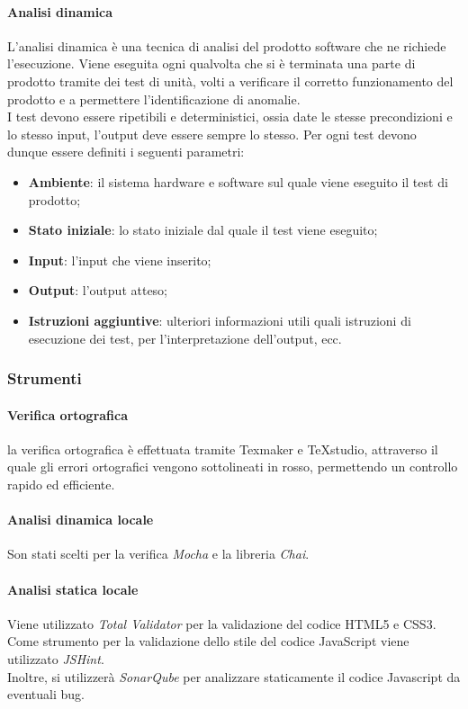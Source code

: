 \documentclass[11pt,a4paper]{article}
\begin{document}
{	\paragraph{Analisi dinamica\\}
	L'analisi dinamica è una tecnica di analisi del prodotto software che ne richiede l'esecuzione. Viene eseguita ogni qualvolta che si è terminata una parte di prodotto tramite dei test di unità, volti a verificare il corretto funzionamento del prodotto e a permettere l'identificazione di anomalie. \\
	I test devono essere ripetibili e deterministici, ossia date le stesse precondizioni e lo stesso input, l'output deve essere sempre lo stesso. Per ogni test devono dunque essere definiti i seguenti parametri:
	\begin{itemize}
		\item \textbf{Ambiente}: il sistema hardware e software sul quale viene eseguito il test di prodotto;
		\item \textbf{Stato iniziale}: lo stato iniziale dal quale il test viene eseguito;
		\item \textbf{Input}: l'input che viene inserito;
		\item \textbf{Output}: l'output atteso;
		\item \textbf{Istruzioni aggiuntive}: ulteriori informazioni utili quali istruzioni di esecuzione dei test, per l'interpretazione dell'output, ecc. 
	\end{itemize}
		
	\subsubsection{Strumenti}	
	\paragraph{Verifica ortografica\\}
	la verifica ortografica è effettuata tramite Texmaker e TeXstudio, attraverso il quale gli errori ortografici vengono sottolineati in rosso, permettendo un controllo rapido ed efficiente.
	\paragraph{Analisi dinamica locale\\}
	Son stati scelti per la verifica \textit{Mocha} e la libreria \textit{Chai}. 
	\paragraph{Analisi statica locale\\}
	Viene utilizzato \textit{Total Validator} per la validazione del codice HTML5 e CSS3. \\
	Come strumento per la validazione dello stile del codice JavaScript viene utilizzato \textit{JSHint}. \\
	Inoltre, si utilizzerà \textit{SonarQube} per analizzare staticamente il codice Javascript da eventuali bug.
	
}
\end{document}
